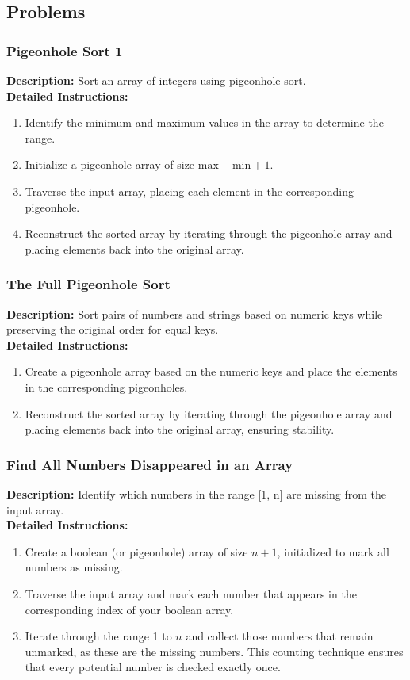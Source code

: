 \subsection{Problems}

\subsubsection{Pigeonhole Sort 1}
\textbf{Description:} Sort an array of integers using pigeonhole sort. \\
\textbf{Detailed Instructions:}
\begin{enumerate}
    \item Identify the minimum and maximum values in the array to determine the range.
    \item Initialize a pigeonhole array of size \(\text{max} - \text{min} + 1\).
    \item Traverse the input array, placing each element in the corresponding pigeonhole.
    \item Reconstruct the sorted array by iterating through the pigeonhole array and placing elements back into the original array.
\end{enumerate}

\subsubsection{The Full Pigeonhole Sort}
\textbf{Description:} Sort pairs of numbers and strings based on numeric keys while preserving the original order for equal keys. \\
\textbf{Detailed Instructions:}
\begin{enumerate}
    \item Create a pigeonhole array based on the numeric keys and place the elements in the corresponding pigeonholes.
    \item Reconstruct the sorted array by iterating through the pigeonhole array and placing elements back into the original array, ensuring stability.
\end{enumerate}

\subsubsection{Find All Numbers Disappeared in an Array}
\textbf{Description:} Identify which numbers in the range [1, n] are missing from the input array. \\
\textbf{Detailed Instructions:}
\begin{enumerate}
    \item Create a boolean (or pigeonhole) array of size \(n+1\), initialized to mark all numbers as missing.
    \item Traverse the input array and mark each number that appears in the corresponding index of your boolean array.
    \item Iterate through the range 1 to \(n\) and collect those numbers that remain unmarked, as these are the missing numbers. This counting technique ensures that every potential number is checked exactly once.
\end{enumerate}

